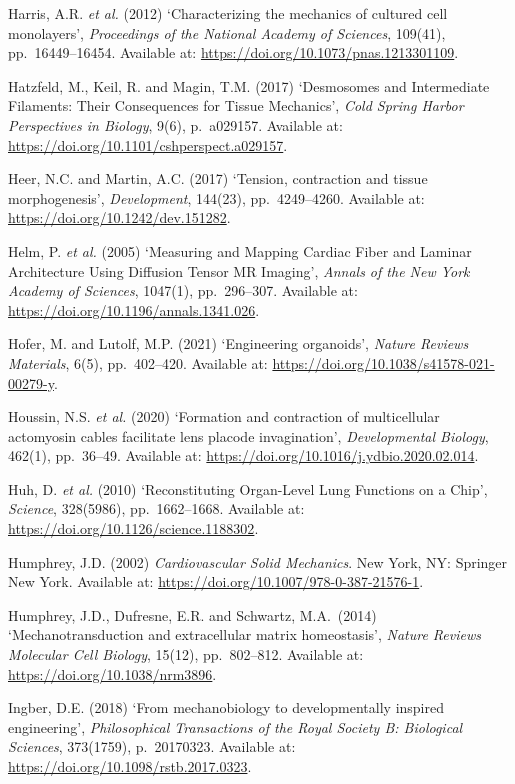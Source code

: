\documentclass[
]{article}
\begin{document}
Harris, A.R. \emph{et al.} (2012) `Characterizing the mechanics of
cultured cell monolayers', \emph{Proceedings of the National Academy of
Sciences}, 109(41), pp.~16449--16454. Available at:
\url{https://doi.org/10.1073/pnas.1213301109}.

Hatzfeld, M., Keil, R. and Magin, T.M. (2017) `Desmosomes and
Intermediate Filaments: Their Consequences for Tissue Mechanics',
\emph{Cold Spring Harbor Perspectives in Biology}, 9(6), p.~a029157.
Available at: \url{https://doi.org/10.1101/cshperspect.a029157}.

Heer, N.C. and Martin, A.C. (2017) `Tension, contraction and tissue
morphogenesis', \emph{Development}, 144(23), pp.~4249--4260. Available
at: \url{https://doi.org/10.1242/dev.151282}.

Helm, P. \emph{et al.} (2005) `Measuring and Mapping Cardiac Fiber and
Laminar Architecture Using Diffusion Tensor MR Imaging', \emph{Annals of
the New York Academy of Sciences}, 1047(1), pp.~296--307. Available at:
\url{https://doi.org/10.1196/annals.1341.026}.

Hofer, M. and Lutolf, M.P. (2021) `Engineering organoids', \emph{Nature
Reviews Materials}, 6(5), pp.~402--420. Available at:
\url{https://doi.org/10.1038/s41578-021-00279-y}.

Houssin, N.S. \emph{et al.} (2020) `Formation and contraction of
multicellular actomyosin cables facilitate lens placode invagination',
\emph{Developmental Biology}, 462(1), pp.~36--49. Available at:
\url{https://doi.org/10.1016/j.ydbio.2020.02.014}.

Huh, D. \emph{et al.} (2010) `Reconstituting Organ-Level Lung Functions
on a Chip', \emph{Science}, 328(5986), pp.~1662--1668. Available at:
\url{https://doi.org/10.1126/science.1188302}.

Humphrey, J.D. (2002) \emph{Cardiovascular Solid Mechanics}. New York,
NY: Springer New York. Available at:
\url{https://doi.org/10.1007/978-0-387-21576-1}.

Humphrey, J.D., Dufresne, E.R. and Schwartz, M.A.~(2014)
`Mechanotransduction and extracellular matrix homeostasis', \emph{Nature
Reviews Molecular Cell Biology}, 15(12), pp.~802--812. Available at:
\url{https://doi.org/10.1038/nrm3896}.

Ingber, D.E. (2018) `From mechanobiology to developmentally inspired
engineering', \emph{Philosophical Transactions of the Royal Society B:
Biological Sciences}, 373(1759), p.~20170323. Available at:
\url{https://doi.org/10.1098/rstb.2017.0323}.
\end{document}
